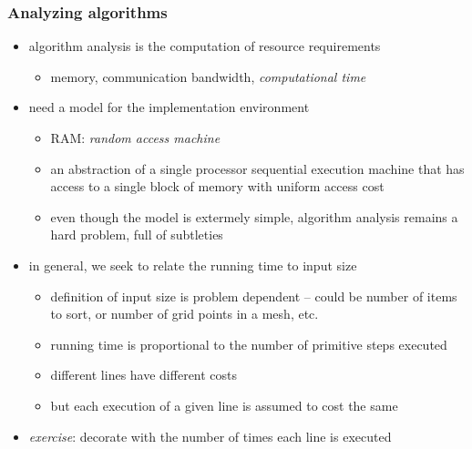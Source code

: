 \begin{frame}[fragile]
%
  \frametitle{Analyzing algorithms}
%
  \begin{itemize}
%
  \item algorithm analysis is the computation of resource requirements
    \begin{itemize}
      \item memory, communication bandwidth, {\em computational time}
    \end{itemize}
%
  \item need a model for the implementation environment
    \begin{itemize}
      \item RAM: {\em random access machine}
      \item an abstraction of a single processor sequential execution machine that has access
        to a single block of memory with uniform access cost
      \item even though the model is extermely simple, algorithm analysis remains a hard
        problem, full of subtleties
    \end{itemize}
%
    \item in general, we seek to relate the running time to input size
      \begin{itemize}
        \item definition of input size is problem dependent -- could be number of items to sort,
          or number of grid points in a mesh, etc.
        \item running time is proportional to the number of primitive steps executed
        \item different lines have different costs
        \item but each execution of a given line is assumed to cost the same
      \end{itemize}
%
    \item {\em exercise}: decorate  with the number of times each line is
      executed
%
  \end{itemize}
%
\end{frame}

